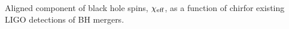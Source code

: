 \label{fig:BHspin} Aligned component of black hole spins, $\chi_{\rm eff}$, as a function of chirfor existing LIGO detections of BH mergers.